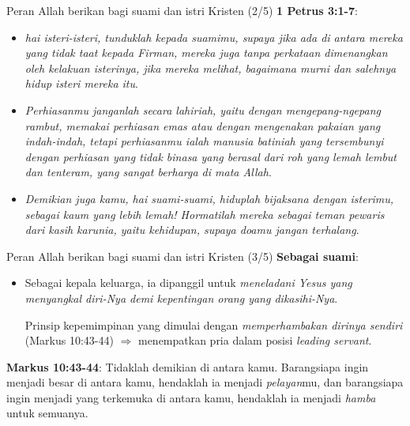 \documentclass{beamer}
\theoremstyle{mystyle}
\let\emph\relax %
\begin{document}
\begin{frame}{Peran Allah berikan bagi suami dan istri Kristen (2/5)}
	\textbf{1 Petrus 3:1-7}: \emph{Hidup bersama suami isteri} \\
	\begin{itemize}
		\item<2-> \textit{hai isteri-isteri, tunduklah kepada suamimu, supaya jika ada di antara mereka yang tidak taat kepada Firman, mereka juga tanpa perkataan dimenangkan oleh kelakuan isterinya, jika mereka melihat, bagaimana murni dan salehnya hidup isteri mereka itu}.
		\item<3-> \textit{Perhiasanmu janganlah secara lahiriah, yaitu dengan mengepang-ngepang rambut, memakai perhiasan emas atau dengan mengenakan pakaian yang indah-indah, tetapi perhiasanmu ialah manusia batiniah yang tersembunyi dengan perhiasan yang tidak binasa yang berasal dari roh yang lemah lembut dan tenteram, yang sangat berharga di mata Allah}.
		\item<4-> \textit{Demikian juga kamu, hai suami-suami, hiduplah bijaksana dengan isterimu, sebagai kaum yang lebih lemah! Hormatilah mereka sebagai teman pewaris dari kasih karunia, yaitu kehidupan, supaya doamu jangan terhalang}.
	\end{itemize}		
\end{frame}

\begin{frame}{Peran Allah berikan bagi suami dan istri Kristen (3/5)}
	\textbf{Sebagai suami}:
	\begin{itemize}
		\item<2-> Sebagai kepala keluarga, ia dipanggil untuk \textit{meneladani Yesus yang menyangkal diri-Nya demi kepentingan orang yang dikasihi-Nya}. 
		
		\bigskip
		 Prinsip kepemimpinan yang dimulai dengan \textit{memperhambakan dirinya sendiri} (Markus 10:43-44) $\Longrightarrow$ menempatkan pria dalam posisi \textit{leading servant}.											
	\end{itemize}

	\bigskip	
	
	 \textbf{Markus 10:43-44}: Tidaklah demikian di antara kamu. Barangsiapa ingin menjadi besar di antara kamu, hendaklah ia menjadi \textit{pelayan}mu, dan barangsiapa ingin menjadi yang terkemuka di antara kamu, hendaklah ia menjadi \textit{hamba} untuk semuanya.
\end{frame}
\end{document}
